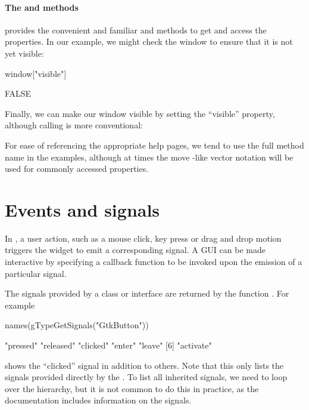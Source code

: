\paragraph{The \code{[} and \code{[\ASSIGN} methods}
 provides the convenient and familiar \code{[} and
\code{[\ASSIGN} methods to get and access the properties. In our example,
we might check the window to ensure that it is not yet visible:
\begin{Schunk}
\begin{Sinput}
 window["visible"]
\end{Sinput}
\begin{Soutput}
[1] FALSE
\end{Soutput}
\end{Schunk}
Finally, we can make our window visible by setting the ``visible'' property,
although calling  is more conventional:
\begin{Schunk}
\end{Schunk}

For ease of referencing the appropriate help pages, we tend to use the
full method name in the examples, although at times the move \R-like
vector notation will be used for commonly accessed properties.


\section{Events and signals}

In , a user action, such as a mouse click, key press or
drag and drop motion triggers the widget to emit a corresponding
signal.  A GUI can be made interactive by specifying a callback
function to be invoked upon the emission of a particular signal.

The signals provided by a class or interface are returned by the
function . For example
\begin{Schunk}
\begin{Sinput}
 names(gTypeGetSignals("GtkButton"))
\end{Sinput}
\begin{Soutput}
[1] "pressed"  "released" "clicked"  "enter"    "leave"   
[6] "activate"
\end{Soutput}
\end{Schunk}
shows the ``clicked'' signal in addition to others. Note that this
only lists the signals provided directly by the . To
list all inherited signals, we need to loop over the hierarchy, but it
is not common to do this in practice, as the documentation includes
information on the signals.

